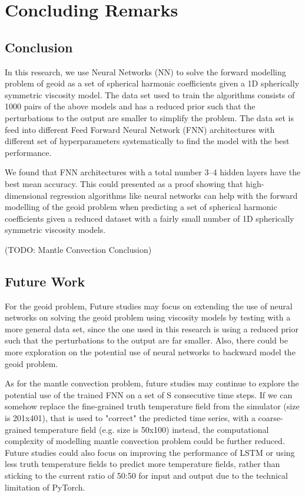 \chapter{Concluding Remarks}\label{chap:conclusion}

\section{Conclusion}

In this research, we use Neural Networks (NN) to solve the forward modelling problem of geoid as a set of spherical harmonic coefficients given a 1D spherically symmetric viscosity model. The data set used to train the algorithms consists of 1000 pairs of the above models and has a reduced prior
such that the perturbations to the output are smaller to simplify the problem. The data set is feed into different Feed Forward Neural Network (FNN) architectures with different set of hyperparameters systematically to find the model with the best performance. 

We found that FNN architectures with a total number 3–4 hidden layers have the best mean accuracy. This could presented as a proof showing that high-dimensional regression algorithms
like neural networks can help with the forward modelling of the geoid problem when predicting
a set of spherical harmonic coefficients given a reduced dataset with a fairly small number of
1D spherically symmetric viscosity models.

(TODO: Mantle Convection Conclusion)

\section{Future Work}

For the geoid problem, Future studies may focus on extending the use of neural networks on solving the geoid problem using viscosity models by testing with a more general data set, since the one used in this research is using a reduced prior such that the perturbations to the output are far smaller. Also, there could be more exploration on the potential use of neural networks to backward model the geoid problem.


As for the mantle convection problem, future studies may continue to explore the potential use of the trained FNN on a set of S consecutive time steps. If we can somehow replace the fine-grained truth temperature field from the simulator (size is 201x401), that is used to "correct" the predicted time series, with a coarse-grained temperature field (e.g. size is 50x100) instead, the computational complexity of modelling mantle convection problem could be further reduced. Future studies could also focus on improving the performance of LSTM or using less truth temperature fields to predict more temperature fields, rather than sticking to the current ratio of 50:50 for input and output due to the technical limitation of PyTorch.